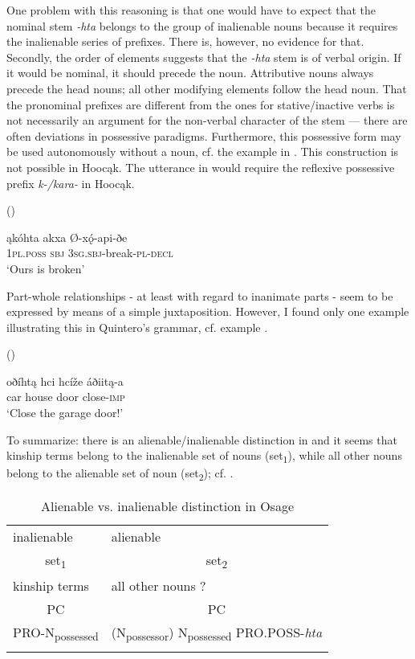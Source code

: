 \documentclass[output=paper]{LSP/langsci}
\begin{document}
One problem with this reasoning is that one would have to expect that the nominal stem \textit{-hta} belongs to the group of inalienable nouns because it requires the inalienable series of prefixes. There is, however, no evidence for that. Secondly, the order of elements suggests that the \textit{-hta} stem is of verbal origin. If it would be nominal, it should precede the  noun. Attributive nouns always precede the head nouns; all other modifying elements follow the head noun. That the pronominal prefixes are different from the ones for stative/inactive verbs is not necessarily an argument for the non-verbal character of the stem --- there are often deviations in possessive paradigms. Furthermore, this possessive form may be used autonomously without a  noun, cf. the example in . This construction is not possible in Hoocąk. The utterance in  would require the reflexive possessive prefix \textit{k-/kara-} in Hoocąk.

\ea	{} (\citealt[413]{Quintero2004}) \label{osagebroken}

\gll ąkóhta     akxa     Ø-xǫ́-api-ðe \\
\textsc{1pl.poss} \textsc{sbj} \textsc{3sg.sbj}-break-\textsc{pl-decl} \\
\glt `Ours is broken'
\z 

Part-whole relationships - at least with regard to inanimate parts - seem to be expressed by means of a simple juxtaposition. However, I found only one example illustrating this in Quintero's grammar, cf. example .

\ea	{} (\citealt[423]{Quintero2004}) \label{osagegarage}

\gll oðíhtą hci      hcíže áðiitą-a \\
car       house door close-\textsc{imp} \\
\glt `Close the garage door!'
\z

To summarize: there is an alienable/inalienable distinction in  and it seems that kinship terms belong to the inalienable set of nouns (set\textsubscript{1}), while all other nouns belong to the alienable set of noun (set\textsubscript{2}); cf. .

\begin{table}
\caption{Alienable vs. inalienable distinction in Osage} \label{osagealienability}
\begin{tabular}{ l l }
\lsptoprule
inalienable & alienable \\
 \multicolumn{1}{c}{set\textsubscript{1}} &  \multicolumn{1}{c}{set\textsubscript{2}} \\
\midrule
 
kinship terms & 	all other nouns ? \\
\midrule
 \multicolumn{1}{c}{PC}	&  \multicolumn{1}{c}{PC} \\
\midrule
PRO-N\textsubscript{possessed} & (N\textsubscript{possessor}) N\textsubscript{possessed} PRO.POSS-\textit{hta} \\
\lspbottomrule
\end{tabular}
\end{table}
\end{document}
